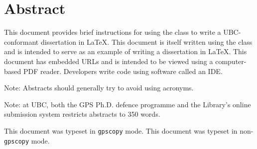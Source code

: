 
\chapter{Abstract}

This document provides brief instructions for using the 
class to write a \acs{UBC}-conformant dissertation in \LaTeX.  This
document is itself written using the  class and is
intended to serve as an example of writing a dissertation in \LaTeX.
This document has embedded \acp{URL} and is intended to be viewed
using a computer-based \ac{PDF} reader. Developers write code using software
called an \ac{IDE}.

Note: Abstracts should generally try to avoid using acronyms.

Note: at \ac{UBC}, both the \ac{GPS} Ph.D. defence programme and the
Library's online submission system restricts abstracts to 350
words.

\ifgpscopy
  This document was typeset in \texttt{gpscopy} mode.
\else
  This document was typeset in non-\texttt{gpscopy} mode.
\fi

